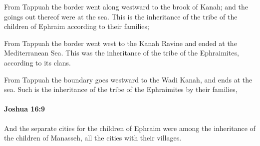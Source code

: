 			\begin{versebox}
					\item[BHS] 
					\item[ASV] From Tappuah the border went along westward to the brook of Kanah; and the goings out thereof were at the sea. This is the inheritance of the tribe of the children of Ephraim according to their families;
					\item[NIV] From Tappuah the border went west to the Kanah Ravine and ended at the Mediterranean Sea. This was the inheritance of the tribe of the Ephraimites, according to its clans.
					\item[NRSV] From Tappuah the boundary goes westward to the Wadi Kanah, and ends at the sea. Such is the inheritance of the tribe of the Ephraimites by their families,
			\end{versebox}

		\paragraph{Joshua 16:9} %
			\label{JOSHUA-16-9}

			And the separate cities for the children of Ephraim were among the inheritance of the children of Manasseh, all the cities with their villages.

